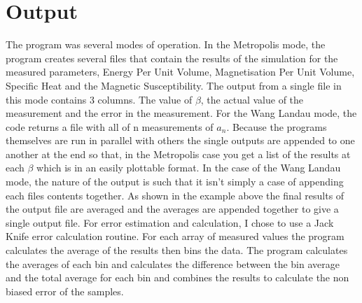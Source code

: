 \section{Output}
The program was several modes of operation. In the Metropolis mode, the program creates several files that contain the results of the simulation for the measured parameters, Energy Per Unit Volume, Magnetisation Per Unit Volume, Specific Heat and the Magnetic Susceptibility.
The output from a single file in this mode contains 3 columns. The value of $\beta$, the actual value of the measurement and the error in the measurement.
For the Wang Landau mode, the code returns a file with all of n measurements of $a_n$.
Because the programs themselves are run in parallel with others the single outputs are appended to one another at the end so that, in the Metropolis case you get a list of the results at each $\beta$ which is in an easily plottable format.
In the case of the Wang Landau mode, the nature of the output is such that it isn't simply a case of appending each files contents together.
As shown in the example above the final results of the output file are averaged and the averages are appended together to give a single output file.
For error estimation and calculation, I chose to use a Jack Knife error calculation routine. For each array of measured values the program calculates the average of the results then bins the data. The program calculates the averages of each bin and calculates the difference between the bin average and the total average for each bin and combines the results to calculate the non biased error of the samples. 
